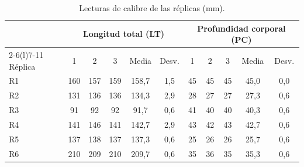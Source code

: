 
\begin{table}[htbp]
\centering\footnotesize
\caption{Lecturas de calibre de las réplicas (mm).}
\label{tab:lecturas-calibre}
\begin{tabular}{@{}lccccc@{\hspace{1.2em}}ccccc@{}}
\toprule
 & \multicolumn{5}{c}{Longitud total (LT)} & \multicolumn{5}{c}{Profundidad corporal (PC)} \\
\cmidrule(lr){2-6}\cmidrule(l){7-11}
Réplica & 1 & 2 & 3 & Media & Desv. & 1 & 2 & 3 & Media & Desv. \\
\midrule
R1 & 160 & 157 & 159 & 158,7 & 1,5 & 45 & 45 & 45 & 45,0 & 0,0 \\
R2 & 131 & 136 & 136 & 134,3 & 2,9 & 28 & 27 & 27 & 27,3 & 0,6 \\
R3 & 91  & 92  & 92  & 91,7  & 0,6 & 41 & 40 & 40 & 40,3 & 0,6 \\
R4 & 141 & 146 & 141 & 142,7 & 2,9 & 43 & 42 & 43 & 42,7 & 0,6 \\
R5 & 137 & 138 & 137 & 137,3 & 0,6 & 25 & 26 & 26 & 25,7 & 0,6 \\
R6 & 210 & 209 & 210 & 209,7 & 0,6 & 35 & 36 & 35 & 35,3 & 0,6 \\
\bottomrule
\end{tabular}
\end{table}
